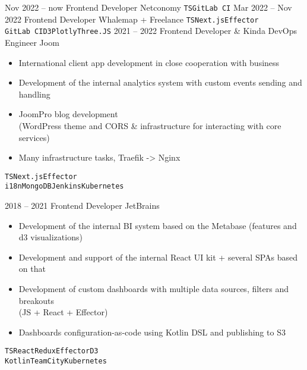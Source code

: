 \documentclass[10pt]{template}
\begin{document}
\begin{entrylist}
    \entry
	{Nov 2022 -- now}
	{Frontend Developer}
	{Netconomy}
	{
		\texttt{TS}\slashsep\texttt{GitLab CI}}
    \entry
	{Mar 2022 -- Nov 2022}
	{Frontend Developer}
	{Whalemap + Freelance}
	{
		\texttt{TS}\slashsep\texttt{Next.js}\slashsep\texttt{Effector}\\
		{\color{gray}\texttt{GitLab CI}\slashsep\texttt{D3}\slashsep\texttt{Plotly}\slashsep\texttt{Three.JS}}}
	\entry
	{2021 -- 2022}
	{Frontend Developer \& Kinda DevOps Engineer}
	{Joom}
	{
	        \begin{itemize}[noitemsep,topsep=5pt,leftmargin=8pt]
		        \item International client app development in close cooperation with business
		        \item Development of the internal analytics system with custom events sending and handling
			\item JoomPro blog development\\ (WordPress theme and CORS \& infrastructure for interacting with core services)
		        \item Many infrastructure tasks, Traefik -> Nginx
		\end{itemize}
		\texttt{TS}\slashsep\texttt{Next.js}\slashsep\texttt{Effector}\\
		{\color{gray}\texttt{i18n}\slashsep\texttt{MongoDB}\slashsep\texttt{Jenkins}\slashsep\texttt{Kubernetes}}}
	\entry
	{2018 -- 2021}
	{Frontend Developer}
	{JetBrains}
	{
	        \begin{itemize}[noitemsep,topsep=5pt,leftmargin=8pt]
		        \item Development of the internal BI system based on the Metabase (features and d3 visualizations)
		        \item Development and support of the internal React UI kit + several SPAs based on that
		        \item Development of custom dashboards with multiple data sources, filters and breakouts\\ (JS + React + Effector)\\ 
		        \item Dashboards configuration-as-code using Kotlin DSL and publishing to S3
		\end{itemize}
		\texttt{TS}\slashsep\texttt{React}\slashsep\texttt{Redux}\slashsep\texttt{Effector}\slashsep\texttt{D3}\\
		{\color{gray} \texttt{Kotlin}\slashsep\texttt{TeamCity}\slashsep\texttt{Kubernetes}}}
\end{entrylist}
\end{document}
